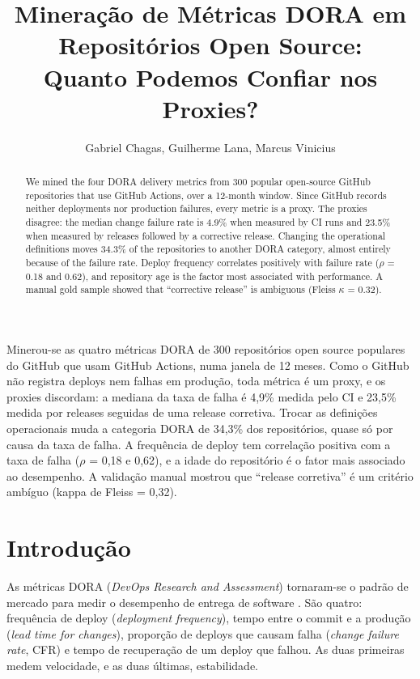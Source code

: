 \documentclass[12pt]{article}
\title{Mineração de Métricas DORA em Repositórios Open Source: \\ Quanto Podemos Confiar nos Proxies?}
\author{Gabriel Chagas\inst{1}, Guilherme Lana\inst{1}, Marcus Vinicius\inst{1}}
\begin{document}
\maketitle

\begin{abstract}
  We mined the four DORA delivery metrics from 300 popular open-source GitHub
  repositories that use GitHub Actions, over a 12-month window. Since GitHub
  records neither deployments nor production failures, every metric is a proxy.
  The proxies disagree: the median change failure rate is 4.9\% when measured
  by CI runs and 23.5\% when measured by releases followed by a corrective
  release. Changing the operational definitions moves 34.3\% of the repositories
  to another DORA category, almost entirely because of the failure rate. Deploy
  frequency correlates positively with failure rate ($\rho$ = 0.18 and 0.62),
  and repository age is the factor most associated with performance. A manual
  gold sample showed that ``corrective release'' is ambiguous (Fleiss
  $\kappa$ = 0.32).
\end{abstract}

\begin{resumo}
  Minerou-se as quatro métricas DORA de 300 repositórios open source populares
  do GitHub que usam GitHub Actions, numa janela de 12 meses. Como o GitHub não
  registra deploys nem falhas em produção, toda métrica é um proxy, e os proxies
  discordam: a mediana da taxa de falha é 4,9\% medida pelo CI e 23,5\% medida
  por releases seguidas de uma release corretiva. Trocar as definições
  operacionais muda a categoria DORA de 34,3\% dos repositórios, quase só por
  causa da taxa de falha. A frequência de deploy tem correlação positiva com a
  taxa de falha ($\rho$ = 0,18 e 0,62), e a idade do repositório é o fator mais
  associado ao desempenho. A validação manual mostrou que ``release corretiva''
  é um critério ambíguo (kappa de Fleiss = 0,32).
\end{resumo}

\section{Introdução}

As métricas DORA (\emph{DevOps Research and Assessment}) tornaram-se o padrão
de mercado para medir o desempenho de entrega de software
\cite{forsgren:2018,dora:guide}. São quatro: frequência de deploy (\emph{deployment
frequency}), tempo entre o commit e a produção (\emph{lead time for changes}),
proporção de deploys que causam falha (\emph{change failure rate}, CFR) e
tempo de recuperação de um deploy que falhou. As duas primeiras medem
velocidade, e as duas últimas, estabilidade.
\end{document}
